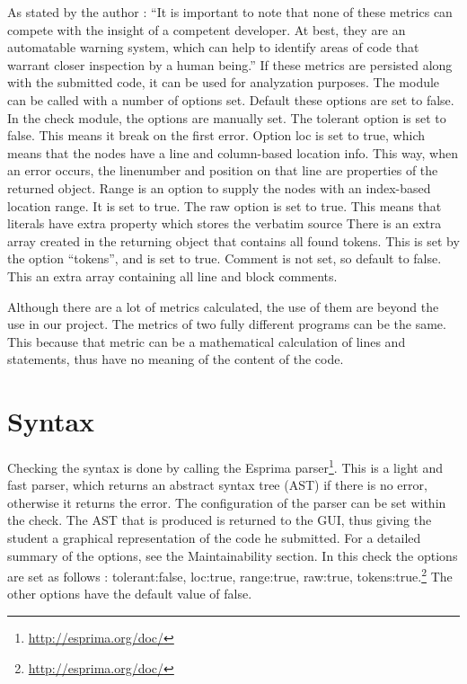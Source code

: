 As stated by the author : ``It is important to note that none of these metrics can compete with the insight of a competent developer. At best, they are an automatable warning system, which can help to identify areas of code that warrant closer inspection by a human being.''
If these metrics are persisted along with the submitted code, it can be used for
analyzation purposes. The module can be called with a number of options set.
Default these options are set to false.
In the \gls{check} module, the options are manually set.
The tolerant option is set to false. This means it break on the first error.
Option loc is set to true, which means that the nodes have a line and column-based location info.
This way, when an error occurs, the linenumber and position on that line are properties of the returned object.
Range is an option to supply the nodes with an index-based location range. It is set to true.
The raw option is set to true. This means that literals have extra property which stores the verbatim source
There is an extra array created in the returning object that contains all found tokens.
This is set by the option ``tokens'', and is set to true.
Comment is not set, so default to false.
This an extra array containing all line and block comments.

Although there are a lot of metrics calculated, the use of them are beyond the
use in our project.
The metrics of two fully different programs can be the same.
This because that metric can be a mathematical calculation of lines and statements,
thus have no meaning of the content of the code.


\section{Syntax}

Checking the syntax is done by calling the Esprima 
parser\footnote{\url{http://esprima.org/doc/}}. This is a light and fast parser, 
which returns an abstract syntax tree (AST) if there is no error, otherwise it returns
the error. The configuration of the parser can be set within the check.
The AST that is produced is returned to the GUI, thus giving the \gls{student} a
graphical representation of the code he submitted.
For a detailed summary of the options, see the Maintainability section.
In this \gls{check} the options are set as follows : tolerant:false, loc:true,
range:true, raw:true, tokens:true.\footnote{\url{http://esprima.org/doc/}}
The other options have the default value of false.



